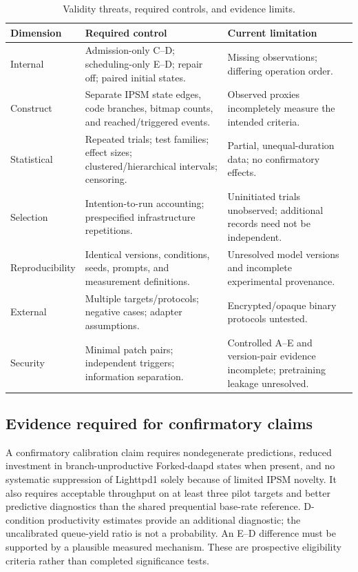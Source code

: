 \documentclass[final,5p,times,number]{elsarticle}
\begin{document}
\begin{table}[!tbp]
\centering\small
\caption{Validity threats, required controls, and evidence limits.}
\label{tab:threats}
\begin{tabularx}{\textwidth}{l Y Y}
\toprule
Dimension & Required control & Current limitation \\
\midrule
Internal & Admission-only C--D; scheduling-only E--D; repair off; paired initial states. & Missing observations; differing operation order. \\
Construct & Separate IPSM state edges, code branches, bitmap counts, and reached/triggered events. & Observed proxies incompletely measure the intended criteria. \\
Statistical & Repeated trials; test families; effect sizes; clustered/hierarchical intervals; censoring. & Partial, unequal-duration data; no confirmatory effects. \\
Selection & Intention-to-run accounting; prespecified infrastructure repetitions. & Uninitiated trials unobserved; additional records need not be independent. \\
Reproducibility & Identical versions, conditions, seeds, prompts, and measurement definitions. & Unresolved model versions and incomplete experimental provenance. \\
External & Multiple targets/protocols; negative cases; adapter assumptions. & Encrypted/opaque binary protocols untested. \\
Security & Minimal patch pairs; independent triggers; information separation. & Controlled A--E and version-pair evidence incomplete; pretraining leakage unresolved. \\
\bottomrule
\end{tabularx}
\end{table}

\subsection{Evidence required for confirmatory claims}
A confirmatory calibration claim requires nondegenerate predictions, reduced investment in branch-unproductive Forked-daapd states when present, and no systematic suppression of Lighttpd1 solely because of limited IPSM novelty. It also requires acceptable throughput on at least three pilot targets and better predictive diagnostics than the shared prequential base-rate reference. D-condition productivity estimates provide an additional diagnostic; the uncalibrated queue-yield ratio is not a probability. An E--D difference must be supported by a plausible measured mechanism. These are prospective eligibility criteria rather than completed significance tests.
\end{document}
